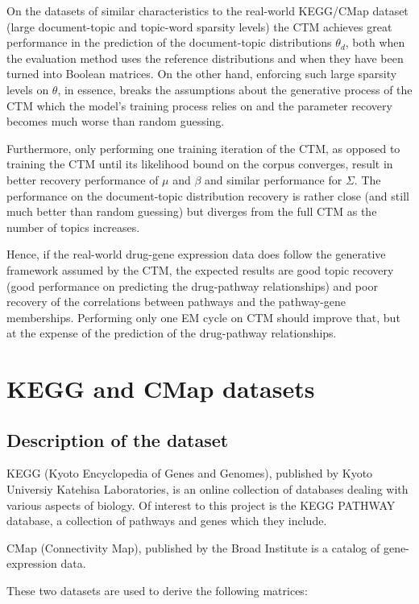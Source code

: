 \documentclass[12pt,a4paper,twoside,openright]{report}
\begin{document}
On the datasets of similar characteristics to the real-world KEGG/CMap dataset (large document-topic and topic-word sparsity levels) the CTM achieves great performance in the prediction of the document-topic distributions $\theta_d$, both when the evaluation method uses the reference distributions and when they have been turned into Boolean matrices. On the other hand, enforcing such large sparsity levels on $\theta$, in essence, breaks the assumptions about the generative process of the CTM which the model's training process relies on and the parameter recovery becomes much worse than random guessing.

Furthermore, only performing one training iteration of the CTM, as opposed to training the CTM until its likelihood bound on the corpus converges, result in better recovery performance of $\mu$ and $\beta$ and similar performance for $\Sigma$. The performance on the document-topic distribution recovery is rather close (and still much better than random guessing) but diverges from the full CTM as the number of topics increases.

Hence, if the real-world drug-gene expression data does follow the generative framework assumed by the CTM, the expected results are good topic recovery (good performance on predicting the drug-pathway relationships) and poor recovery of the correlations between pathways and the pathway-gene memberships. Performing only one EM cycle on CTM should improve that, but at the expense of the prediction of the drug-pathway relationships.

\section{KEGG and CMap datasets}

\subsection{Description of the dataset}

KEGG (Kyoto Encyclopedia of Genes and Genomes), published by Kyoto Universiy Katehisa Laboratories, is an online collection of databases dealing with various aspects of biology. Of interest to this project is the KEGG PATHWAY database, a collection of pathways and genes which they include.

CMap (Connectivity Map), published by the Broad Institute is a catalog of gene-expression data.

These two datasets are used to derive the following matrices:
\end{document}
